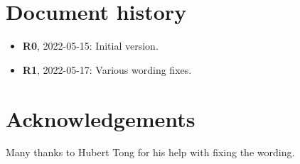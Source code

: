 
\section*{Document history}

\begin{itemize}
\item \textbf{R0}, 2022-05-15: Initial version.
\item \textbf{R1}, 2022-05-17: Various wording fixes.
\end{itemize}


\section*{Acknowledgements}

Many thanks to Hubert Tong for his help with fixing the wording.


\renewcommand{\bibname}{References}




